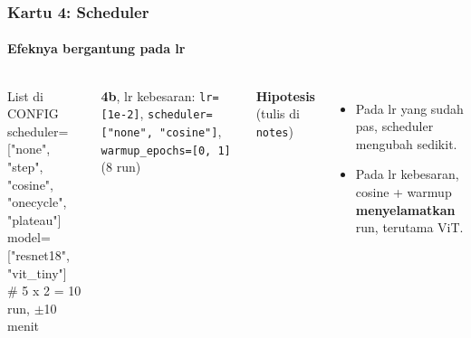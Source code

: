 \documentclass[t,aspectratio=169,xcolor={dvipsnames,table}]{beamer}
\begin{document}
\begin{frame}
    \frametitle{Kartu 4: Scheduler}
    \framesubtitle{Efeknya bergantung pada lr}
    \footnotesize

    \begin{columns}[T]
        \begin{block}{List di CONFIG}
            {\ttfamily\scriptsize scheduler=["none", "step", "cosine",\\\hspace*{5.6em}"onecycle", "plateau"]\\model=["resnet18", "vit\_tiny"]\\\# 5 x 2 = 10 run, $\pm$10 menit}
        \end{block}
        {\scriptsize\textbf{4b}, lr kebesaran: \texttt{lr=[1e-2]}, \texttt{scheduler=["none", "cosine"]}, \texttt{warmup\_epochs=[0, 1]} (8 run)}

        \textbf{Hipotesis} (tulis di \texttt{notes})
        \begin{itemize}
            \item Pada lr yang sudah pas, scheduler mengubah sedikit.
            \item Pada lr kebesaran, cosine + warmup \textbf{menyelamatkan} run, terutama ViT.
        \end{itemize}


\end{columns}
\end{frame}
\end{document}
